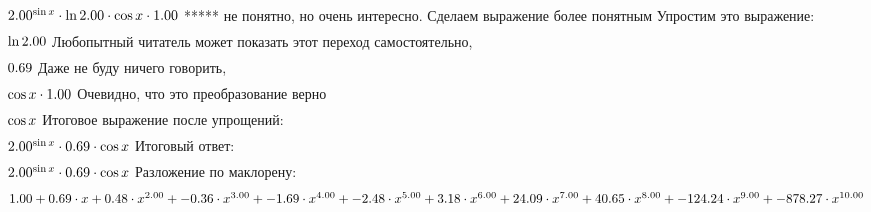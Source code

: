 \begin{gather}
\end{gather}
\begin{math}
2.00 ^ {\sin x }\cdot \ln 2.00 \cdot \cos x \cdot 1.00 \\
\end{math}
***** не понятно, но очень интересно. Сделаем выражение более понятным
Упростим это выражение: 
\begin{gather}
\end{gather}
\begin{math}
\ln 2.00 \\
\end{math}
Любопытный читатель может показать этот переход самостоятельно, 
\begin{gather}
\end{gather}
\begin{math}
0.69 \\
\end{math}
Даже не буду ничего говорить, 
\begin{gather}
\end{gather}
\begin{math}
\cos x \cdot 1.00 \\
\end{math}
Очевидно, что это преобразование верно
\begin{gather}
\end{gather}
\begin{math}
\cos x \\
\end{math}
Итоговое выражение после упрощений:
\begin{gather}
\end{gather}
\begin{math}
2.00 ^ {\sin x }\cdot 0.69 \cdot \cos x \\
\end{math}
Итоговый ответ: 
\begin{gather}
\end{gather}
\begin{math}
2.00 ^ {\sin x }\cdot 0.69 \cdot \cos x \\
\end{math}
Разложение по маклорену: 
\begin{gather}
\end{gather}
\begin{math}
1.00 + 0.69 \cdot x + 0.48 \cdot x ^ {2.00 }+ -0.36 \cdot x ^ {3.00 }+ -1.69 \cdot x ^ {4.00 }+ -2.48 \cdot x ^ {5.00 }+ 3.18 \cdot x ^ {6.00 }+ 24.09 \cdot x ^ {7.00 }+ 40.65 \cdot x ^ {8.00 }+ -124.24 \cdot x ^ {9.00 }+ -878.27 \cdot x ^ {10.00 }\\
\end{math}

